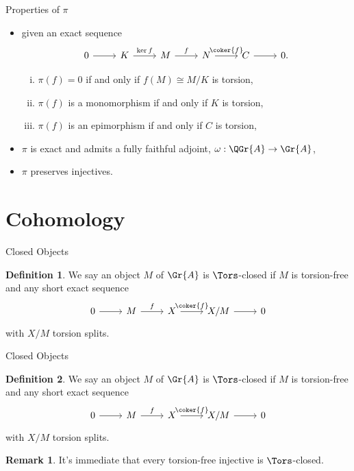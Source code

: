 \documentclass{beamer}
\theoremstyle{definition}
\newtheorem{defn}{Definition}
\newtheorem{rmk}{Remark}
\begin{document}
\begin{frame}[fragile]{Properties of $\pi$}
  \begin{itemize}
  \item
    given an exact sequence
    $$\begin{tikzcd}
      0 \arrow{r} & K \arrow{r}{\ker{f}} & M \arrow{r}{f} & N \arrow{r}{\coker{f}} & C \arrow{r} & 0.
    \end{tikzcd}$$
    \begin{enumerate}[(i)]
    \item
      $\pi(f) = 0$ if and only if $f(M) \cong M/K$ is torsion,
    \item
      $\pi(f)$ is a monomorphism if and only if $K$ is torsion, 
    \item
      $\pi(f)$ is an epimorphism if and only if $C$ is torsion,
    \end{enumerate}
  \item
    $\pi$ is exact and admits a fully faithful adjoint, $\omega : \QGr{A} \rightarrow \Gr{A}$,
  \item
    $\pi$ preserves injectives.
  \end{itemize}
\end{frame}

\section{Cohomology}

\begin{frame}[fragile]{Closed Objects}
  \begin{defn}
    We say an object $M$ of $\Gr{A}$ is $\Tors$-closed if $M$ is torsion-free and any short exact sequence 
      $$\begin{tikzcd}
          0 \arrow{r} & M \arrow{r}{f} & X \arrow{r}{\coker{f}} & X/M \arrow{r} & 0
        \end{tikzcd}$$
      with $X/M$ torsion splits.
  \end{defn}
\end{frame}

\begin{frame}[fragile]{Closed Objects}
  \begin{defn}
    We say an object $M$ of $\Gr{A}$ is $\Tors$-closed if $M$ is torsion-free and any short exact sequence 
      $$\begin{tikzcd}
          0 \arrow{r} & M \arrow{r}{f} & X \arrow{r}{\coker{f}} & X/M \arrow{r} & 0
        \end{tikzcd}$$
      with $X/M$ torsion splits.
  \end{defn}
    \begin{rmk}
    It's immediate that every torsion-free injective is $\Tors$-closed.
  \end{rmk}
\end{frame}
\end{document}
